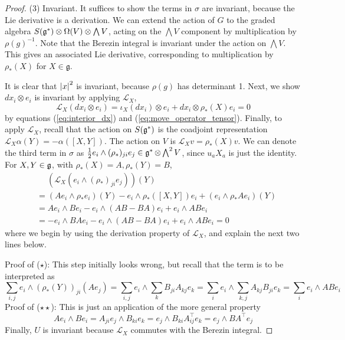 \begin{proof}
(3) Invariant. %
It suffices to show the terms in $\sigma$ are invariant, because
the Lie derivative is a derivation. We can extend the action of $G$ to the
graded algebra $S(\operatorname{\mathfrak{g}}^*)\otimes \Omega(V)\otimes \bigwedge V$,
acting on the $\bigwedge V$ component by multiplication by $\rho(g)^{-1}$. 
Note that the Berezin integral is
invariant under the action on $\bigwedge V$. This gives an associated Lie derivative,
corresponding to multiplication by $\rho_*(X)$ for  $X\in\mathfrak{g}$.

It is clear that $\abs{x}^2$ is invariant, because $\rho(g)$ has determinant 1.
Next, we show $dx_i\otimes e_i$ is invariant by applying $\mathcal{L}_X$,
\[
\mathcal{L}_X (dx_i\otimes e_i) = \iota_X(dx_i) \otimes e_i + dx_i \otimes
\rho_*(X)e_i = 0
\] 
by equations (\ref{eq:interior_dx}) and (\ref{eq:move_operator_tensor}).
Finally, to apply $\mathcal{L}_X$, recall that the action on $S(\operatorname{\mathfrak{g}}^*)$ 
is the coadjoint representation $\mathcal{L}_X \alpha(Y) = -\alpha ([X,Y])$. 
The action on $V$ is  $\mathcal{L}_X v = \rho_*(X)v$.
We can denote the third term in $\sigma$
as $\frac{1}{2}e_i\wedge (\rho_*)_{ji} e_j \in \operatorname{\mathfrak{g}}^*\otimes \bigwedge^2V$,
since $u_aX_a$ is just the identity.
For $X,Y\in\operatorname{\mathfrak{g}}$, with  $\rho_*(X)=A,\rho_*(Y)=B$,
\begin{align*}
	&\quad\;(\mathcal{L}_X(e_i \wedge (\rho_*)_{ji} e_j))(Y) \\
	&= (A e_i \wedge \rho_* e_i)(Y)
	- e_i \wedge \rho_*([X,Y]) e_i
	+ (e_i \wedge \rho_* A e_i)(Y) \\
	&= Ae_i \wedge B e_i
	- e_i \wedge (AB-BA) e_i
	+ e_i \wedge A Be_i \tag{$\star$} \\
	&= -e_i \wedge BA e_i
	- e_i \wedge (AB-BA) e_i
	+ e_i \wedge AB e_i = 0\tag{$\star\star$}
\end{align*}
where we begin by using the derivation property of $\mathcal{L}_X$, and explain
the next two lines below.

Proof of ($\star$): This step initially looks wrong, but recall that the term is
to be interpreted as 
\[
\sum_{i,j}e_i\wedge (\rho_*(Y))_{ji} (Ae_j)
=\sum_{i,j}e_i\wedge \sum_kB_{ji} A_{kj}e_k
=\sum_{i}e_i\wedge \sum_{k,j}A_{kj}B_{ji} e_k
=\sum_{i}e_i\wedge AB e_i
\] 
Proof of ($\star\star$): This is just an application of the more general property
\[
Ae_i \wedge Be_i
= A_{ji}e_j \wedge B_{ki}e_k
= e_j \wedge B_{ki}A^\intercal_{ij}e_k
= e_j \wedge BA^\intercal e_j 
\] 
Finally, $U$ is invariant because $\mathcal{L}_X$ commutes with the Berezin
integral.
\end{proof}

